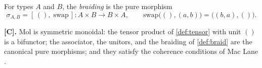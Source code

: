 \begin{definition}[Braiding]\label{def:braid}
For types $A$ and $B$, the \emph{braiding} is the pure morphism
\[ \sigma_{A,B} = [\, (),\; \mathrm{swap} \,] : A \times B \to B \times A ,
   \qquad \mathrm{swap}\bigl ((), (a, b)\bigr) = \bigl ((b, a), ()\bigr) . \]
\end{definition}

\begin{theorem}\label{thm:3}
\textbf{[C].} Mol is symmetric monoidal: the tensor product of
\autoref{def:tensor} with unit $()$ is a bifunctor; the associator, the
unitors, and the braiding of \autoref{def:braid} are the canonical pure
morphisms; and they satisfy the coherence conditions of Mac Lane
\citep{maclane}.
\end{theorem}

